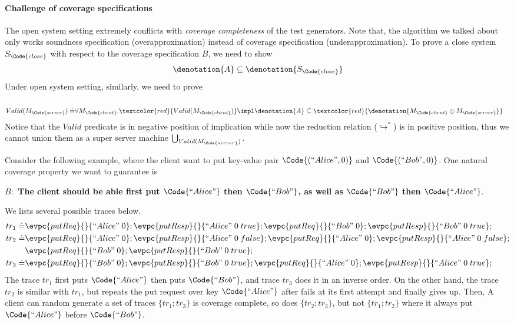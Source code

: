 \paragraph{Challenge of coverage specifications} The open system setting extremely conflicts with \emph{coverage completeness} of the test generators. Note that, the algorithm we talked about only works soundness specification (overapproximation) instead of coverage specification (underapproximation). To prove a close system $S_{\Code{close}}$ with respect to the coverage specification $B$, we need to show
\begin{align*}
     \denotation{A} \subseteq \denotation{S_{\Code{close}}} 
\end{align*}\noindent
Under open system setting, similarly, we need to prove
\begin{align*}
 \\Valid(M_{\Code{server}}) \doteq&
    \forall M_{\Code{client}}. \textcolor{red}{Valid(M_{\Code{client}})} \impl 
    \denotation{A} \subseteq \textcolor{red}{\denotation{M_{\Code{client}} \oplus M_{\Code{server}}}}
\end{align*}\noindent
Notice that the $Valid$ predicate is in negative position of implication while now the reduction relation ($\hookrightarrow^*$) is in positive position, thus we cannot union them as a super server machine $\bigcup_{ Valid(M_{\Code{server}})}$.

Consider the following example, where the client want to put key-value pair $\Code{(``Alice", 0)}$ and $\Code{(``Bob", 0)}$. One natural coverage property we want to guarantee is

\textbf{$B:$ The client should be able first put $\Code{``Alice"}$ then $\Code{``Bob"}$, as well as $\Code{``Bob"}$ then $\Code{``Alice"}$}.

\noindent We lists several possible traces below.
{\small\begin{align*}
    tr_1 \doteq &\evpc{putReq}{}{``Alice"\; 0};\evpc{putResp}{}{``Alice"\; 0\; true};\evpc{putReq}{}{``Bob"\; 0};\evpc{putResp}{}{``Bob"\; 0\; true};
    \\tr_2 \doteq &\evpc{putReq}{}{``Alice"\; 0};\evpc{putResp}{}{``Alice"\; 0\; false};
    \evpc{putReq}{}{``Alice"\; 0};\evpc{putResp}{}{``Alice"\; 0\; false};
    \\&\evpc{putReq}{}{``Bob"\; 0};\evpc{putResp}{}{``Bob"\; 0\; true};
    \\tr_3 \doteq &\evpc{putReq}{}{``Bob"\; 0};\evpc{putResp}{}{``Bob"\; 0\; true};
    \evpc{putReq}{}{``Alice"\; 0};\evpc{putResp}{}{``Alice"\; 0\; true};
\end{align*}}\noindent
The trace $tr_1$ first puts $\Code{``Alice"}$ then puts $\Code{``Bob"}$, and trace $tr_3$ does it in an inverse order. On the other hand, the trace $tr_2$ is similar with $tr_1$, but repeats the put request over key $\Code{``Alice"}$ after fails at its first attempt and finally gives up. Then, A client can random generate a set of traces $\{tr_1; tr_3\}$ is coverage complete, so does $\{tr_2; tr_3\}$, but not $\{tr_1; tr_2\}$ where it always put $\Code{``Alice"}$ before $\Code{``Bob"}$. 


